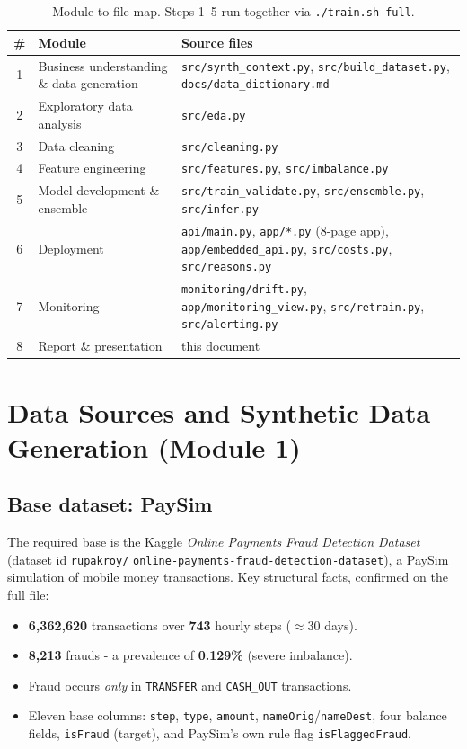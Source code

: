 \documentclass[11pt,a4paper]{report}
\newcommand{\code}[1]{\texttt{\small #1}}
\begin{document}
\begin{table}[h]
\centering
\small
\begin{tabularx}{\textwidth}{@{}c l Y@{}}
\toprule
\textbf{\#} & \textbf{Module} & \textbf{Source files}\\
 & Business understanding \& data generation & \code{src/synth\_context.py}, \code{src/build\_dataset.py}, \code{docs/data\_dictionary.md}\\
2 & Exploratory data analysis & \code{src/eda.py}\\
3 & Data cleaning & \code{src/cleaning.py}\\
4 & Feature engineering & \code{src/features.py}, \code{src/imbalance.py}\\
5 & Model development \& ensemble & \code{src/train\_validate.py}, \code{src/ensemble.py}, \code{src/infer.py}\\
6 & Deployment & \code{api/main.py}, \code{app/*.py} (8-page app), \code{app/embedded\_api.py}, \code{src/costs.py}, \code{src/reasons.py}\\
7 & Monitoring & \code{monitoring/drift.py}, \code{app/monitoring\_view.py}, \code{src/retrain.py}, \code{src/alerting.py}\\
8 & Report \& presentation & this document\\
\bottomrule
\end{tabularx}
\caption{Module-to-file map. Steps 1–5 run together via \code{./train.sh full}.}
\label{tab:modmap}
\end{table}

\chapter{Data Sources and Synthetic Data Generation (Module 1)}
\label{ch:m1}

\section{Base dataset: PaySim}

The required base is the Kaggle \emph{Online Payments Fraud Detection Dataset}~\cite{kaggle}
(dataset id \code{rupakroy/} \code{online-payments-fraud-detection-dataset}), a PaySim
simulation of mobile money transactions. Key structural facts, confirmed on the full file:

\begin{itemize}[nosep,leftmargin=1.4em]
  \item \textbf{6{,}362{,}620} transactions over \textbf{743} hourly steps ($\approx$30 days).
  \item \textbf{8{,}213} frauds - a prevalence of \textbf{0.129\%} (severe imbalance).
  \item Fraud occurs \emph{only} in \code{TRANSFER} and \code{CASH\_OUT} transactions.
  \item Eleven base columns: \code{step}, \code{type}, \code{amount},
        \code{nameOrig}/\code{nameDest}, four balance fields, \code{isFraud} (target),
        and PaySim's own rule flag \code{isFlaggedFraud}.
\end{itemize}
\end{document}
